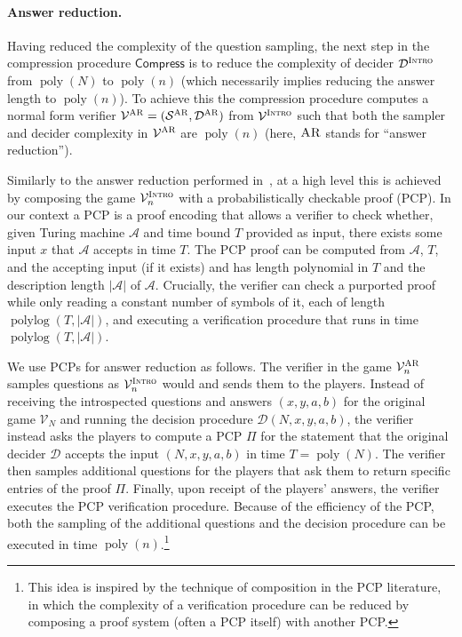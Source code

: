 \documentclass[11pt]{article}
\theoremstyle{definition}
\DeclareMathOperator{\poly}{poly}
\DeclareMathOperator{\polylog}{polylog}
\newcommand{\sampler}{\mathcal{S}}
\newcommand{\decider}{\mathcal{D}}
\newcommand{\verifier}{\mathcal{V}}
\newcommand{\gamestyle}[1]{\ensuremath{\textsc{#1}}\xspace}
\newcommand{\ar}{\gamestyle{AR}}
\newcommand{\intro}{\gamestyle{Intro}}
\renewcommand{\cal}[1]{\mathcal{#1}}
\newcommand{\tmstyle}[1]{\ensuremath{\mathsf{#1}}}
\newcommand{\Compress}{\tmstyle{Compress}}
\begin{document}
		
\paragraph{Answer reduction.} 
Having reduced the complexity of the question sampling, the next step in the compression procedure $\Compress$ is to reduce the complexity of decider $\decider^\intro$ from $\poly(N)$ to $\poly(n)$ (which necessarily implies reducing the answer length to $\poly(n)$). To achieve this the compression procedure computes a normal form verifier $\verifier^\ar = (\sampler^\ar,\decider^\ar)$ from $\verifier^\intro$ such that both the sampler and decider complexity in $\verifier^\ar$ are $\poly(n)$ (here, $\ar$ stands for ``answer reduction'').

Similarly to the answer reduction performed in~\cite{NW19}, at a high level this is achieved by composing the game $\verifier^\intro_n$ with a probabilistically checkable proof (PCP). In our context a PCP is a proof encoding that allows a verifier to check whether, given Turing machine $\cal{A}$ and time bound $T$ provided as input, there exists some input $x$ that $\cal{A}$ accepts in time $T$. The PCP proof can be computed from $\cal{A}$, $T$, and the accepting input (if it exists) and has length polynomial in $T$ and the description length $|\cal{A}|$ of $\cal{A}$. Crucially, the verifier can check a purported proof while only reading a constant number of symbols of it, each of length $\polylog(T,|\cal{A}|)$, and executing a verification procedure that runs in time $\polylog(T,|\cal{A}|)$. 

We use PCPs for answer reduction as follows. The verifier in the game $\verifier^\ar_n$ samples questions as $\verifier^\intro_n$ would and sends them to the players. Instead of receiving the introspected questions and answers $(x,y,a,b)$ for the original game $\verifier_N$ and running the decision procedure $\decider(N,x,y,a,b)$, the verifier instead asks the players to compute a PCP $\Pi$ for the statement that the original decider $\decider$ accepts the input $(N,x,y,a,b)$ in time $T=\poly(N)$. The verifier then samples additional questions for the players that ask them to return specific entries of the proof $\Pi$. Finally, upon receipt of the players' answers, the verifier executes the PCP verification procedure. Because of the efficiency of the PCP, both the sampling of the additional questions and the decision procedure can be executed in time $\poly(n)$.\footnote{This idea is inspired by the technique of composition in the PCP literature, in which the complexity of a verification procedure can be reduced by composing a proof system (often a PCP itself) with another PCP.}
\end{document}
